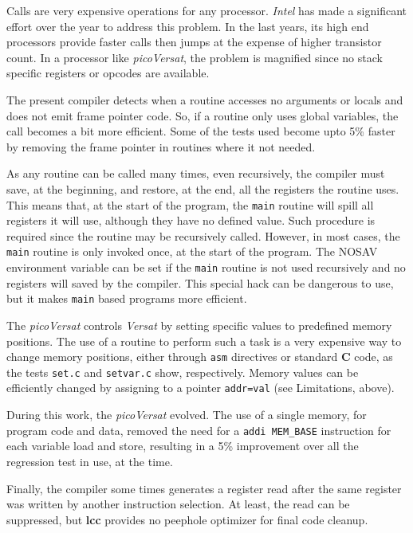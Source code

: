 \documentclass[journal]{IEEEtran}
\begin{document}
Calls are very expensive operations for any processor.
{\it Intel} has made a significant effort over the year to address this
problem.
In the last years, its high end processors provide faster calls then jumps
at the expense of higher transistor count. %
In a processor like {\it picoVersat}, the problem is magnified since
no stack specific registers or opcodes are available.

The present compiler detects when a routine accesses no arguments or locals
and does not emit frame pointer code. So, if a routine only uses global
variables, the call becomes a bit more efficient.
Some of the tests used become upto 5\% faster by removing the frame
pointer in routines where it not needed.

As any routine can be called many times, even recursively, the compiler
must save, at the beginning, and restore, at the end,
all the registers the routine uses.
This means that, at the start of the program, the {\tt main} routine will spill
all registers it will use, although they have no defined value.
Such procedure is required since the routine may be recursively called.
However, in most cases, the {\tt main} routine is only invoked once, at
the start of the program.
The {\sc NOSAV} environment variable can be set if the {\tt main}
routine is not used recursively and no registers will saved by the compiler.
This special hack can be dangerous to use, but it makes {\tt main} based
programs more efficient.

The {\it picoVersat} controls {\it Versat} by setting specific values to
predefined memory positions.
The use of a routine to perform such a task is a very
expensive way to change memory positions, either through {\tt asm}
directives or standard {\bf C} code, as the tests {\tt set.c} and
{\tt setvar.c} show, respectively.
Memory values can be efficiently changed by assigning to a pointer
{\tt *addr=val} (see Limitations, above).

During this work, the {\it picoVersat} evolved. The use of a single
memory, for program code and data, removed the need for a {\tt addi MEM\_BASE}
instruction for each variable load and store, resulting in a 5\% improvement
over all the regression test in use, at the time. %

Finally, the compiler some times generates a register read after the
same register was written by another instruction selection.
At least, the read can be suppressed, but {\bf lcc} provides no
peephole optimizer for final code cleanup.
\end{document}
